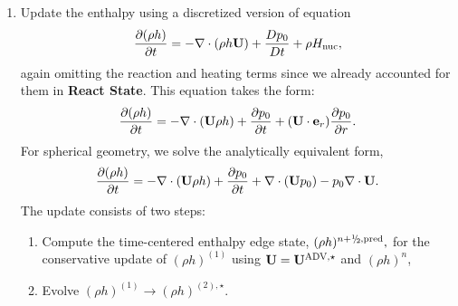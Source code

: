 \documentclass{aastex62}
\newcommand{\sfrac}[2]{\mathchoice
  {\kern0em\raise.5ex\hbox{\the\scriptfont0 #1}\kern-.15em/
   \kern-.15em\lower.25ex\hbox{\the\scriptfont0 #2}}
  {\kern0em\raise.5ex\hbox{\the\scriptfont0 #1}\kern-.15em/
   \kern-.15em\lower.25ex\hbox{\the\scriptfont0 #2}}
  {\kern0em\raise.5ex\hbox{\the\scriptscriptfont0 #1}\kern-.2em/
   \kern-.15em\lower.25ex\hbox{\the\scriptscriptfont0 #2}}
  {#1\!/#2}}
\newcommand{\myhalf}{\sfrac{1}{2}}
\newcommand{\eb}{{\bf{e}}}
\newcommand{\Ub}{{\bf{U}}}
\newcommand{\dt}{\Delta t}
\newcommand{\Hnuc}{H_{\rm nuc}}
\newcommand{\pred}{{\rm pred}}
\newcommand{\nph}{{n+\myhalf}}
\newcommand{\uadvone}{\Ub^{\mathrm{ADV},\star}}
\begin{document}
\begin{description}
\begin{enumerate}
\item Update the enthalpy using a discretized version of equation
%
\begin{equation}
\frac{\partial(\rho h)}{\partial t} = -\nabla\cdot(\rho h\Ub) + \frac{Dp_0}{Dt} + \rho\Hnuc,
\end{equation}
%
again omitting the reaction and heating terms
since we already accounted for
them in {\bf React State}.  This equation takes the form:
\begin{equation}
\frac{\partial (\rho h)}{\partial t}  = - \nabla \cdot (\Ub \rho h) + \frac{\partial p_0}{\partial t} + (\Ub \cdot \eb_r) \frac{\partial p_0}{\partial r}.
\end{equation}
For spherical geometry, we solve the
analytically equivalent form,
\begin{equation}
\frac{\partial (\rho h)}{\partial t}  = - \nabla \cdot (\Ub \rho h) + \frac{\partial p_0}{\partial t} + \nabla \cdot (\Ub p_0) - p_0 \nabla \cdot \Ub.
\end{equation}
The update consists of two steps:

\begin{enumerate}
\renewcommand{\labelenumii}{{\bf \roman{enumii}}.}

\item Compute the time-centered enthalpy edge state, $(\rho h)^{\nph,\pred},$
  for the conservative update of $(\rho h)^{(1)}$
  using $\Ub = \uadvone$ and $(\rho h)^n$,

\item Evolve $(\rho h)^{(1)} \rightarrow (\rho h)^{(2),\star}$.


\end{enumerate}
\end{enumerate}
\end{description}
\end{document}
